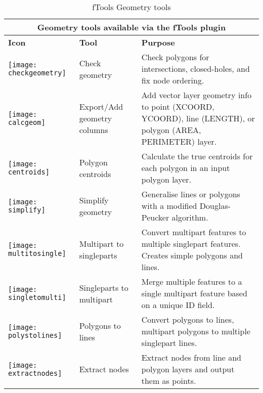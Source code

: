 \begin{table}[ht]
\centering
\caption{fTools Geometry tools}\label{tab:ftool_geometry}\medskip
 \begin{tabular}{|p{0.3in}|p{1.2in}|p{4.8in}|}
 \hline \multicolumn{3}{|c|}{\textbf{Geometry tools available via the fTools plugin}} \\
 \hline \textbf{Icon} & \textbf{Tool} & \textbf{Purpose} \\
 \hline \texttt{[image: checkgeometry]} & Check geometry & 
Check polygons for intersections, closed-holes, and fix node ordering. \\
 \hline \texttt{[image: calcgeom]} & Export/Add geometry 
columns & Add vector layer geometry info to point (XCOORD, YCOORD), 
line (LENGTH), or polygon (AREA, PERIMETER) layer. \\
 \hline \texttt{[image: centroids]} & Polygon centroids & 
Calculate the true centroids for each polygon in an input polygon layer. \\
 \hline \texttt{[image: simplify]} & Simplify geometry & 
Generalise lines or polygons with a modified Douglas-Peucker algorithm. \\
 \hline \texttt{[image: multitosingle]} & Multipart to 
singleparts & Convert multipart features to multiple singlepart features. 
Creates simple polygons and lines. \\
 \hline \texttt{[image: singletomulti]} & Singleparts to 
multipart & Merge multiple features to a single multipart feature based 
on a unique ID field. \\
 \hline \texttt{[image: polystolines]} & Polygons to lines 
& Convert polygons to lines, multipart polygons to multiple singlepart lines. \\
 \hline \texttt{[image: extractnodes]} & Extract nodes & 
Extract nodes from line and polygon layers and output them as points. \\
 \hline
\end{tabular}
\end{table}

